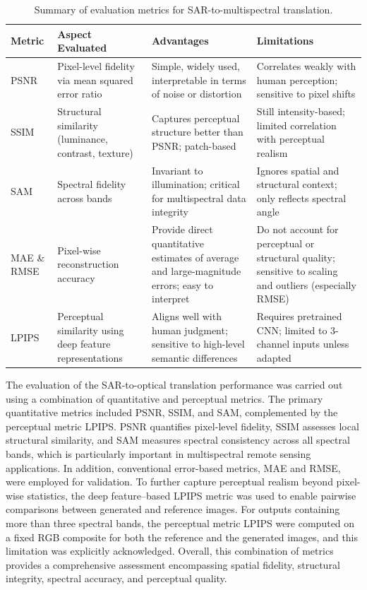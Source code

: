 \renewcommand{\arraystretch}{1.25} %
\begin{table}[!htbp]
	\centering
	\caption[Evaluation metrics used summary]{Summary of evaluation metrics for SAR-to-multispectral translation.}
	\begin{tabularx}{\textwidth}{p{1.7cm}X X X}
		\toprule
		\textbf{Metric} & \textbf{Aspect Evaluated} & \textbf{Advantages} & \textbf{Limitations} \\
		\midrule
		PSNR  & Pixel-level fidelity via mean squared error ratio & Simple, widely used, interpretable in terms of noise or distortion & Correlates weakly with human perception; sensitive to pixel shifts \\
		SSIM  & Structural similarity (luminance, contrast, texture) & Captures perceptual structure better than PSNR; patch-based & Still intensity-based; limited correlation with perceptual realism \\
		SAM   & Spectral fidelity across bands & Invariant to illumination; critical for multispectral data integrity & Ignores spatial and structural context; only reflects spectral angle \\
		MAE \& RMSE & Pixel-wise reconstruction accuracy & Provide direct quantitative estimates of average and large-magnitude errors; easy to interpret & Do not account for perceptual or structural quality; sensitive to scaling and outliers (especially RMSE) \\
		LPIPS & Perceptual similarity using deep feature representations & Aligns well with human judgment; sensitive to high-level semantic differences & Requires pretrained CNN; limited to 3-channel inputs unless adapted \\
		\bottomrule
	\end{tabularx}
\end{table}
\renewcommand{\arraystretch}{1.0} %


\bigskip
\noindent
The evaluation of the SAR-to-optical translation performance was carried out using a combination of quantitative and perceptual metrics. The primary quantitative metrics included PSNR, SSIM, and SAM, complemented by the perceptual metric LPIPS. PSNR quantifies pixel-level fidelity, SSIM assesses local structural similarity, and SAM measures spectral consistency across all spectral bands, which is particularly important in multispectral remote sensing applications. In addition, conventional error-based metrics, MAE and RMSE, were employed for validation. To further capture perceptual realism beyond pixel-wise statistics, the deep feature–based LPIPS metric was used to enable pairwise comparisons between generated and reference images. For outputs containing more than three spectral bands, the perceptual metric LPIPS were computed on a fixed RGB composite for both the reference and the generated images, and this limitation was explicitly acknowledged. Overall, this combination of metrics provides a comprehensive assessment encompassing spatial fidelity, structural integrity, spectral accuracy, and perceptual quality.
